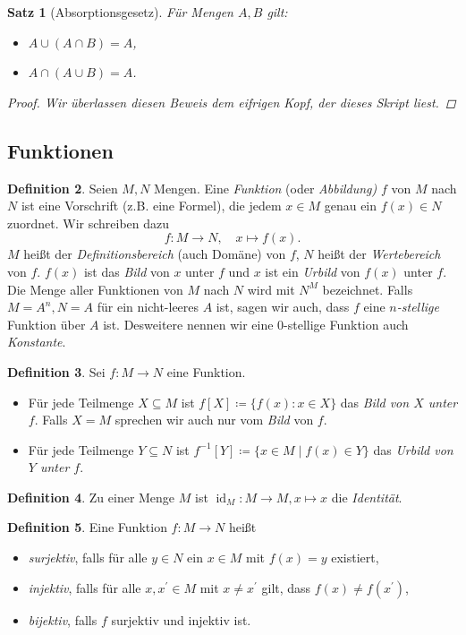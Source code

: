 \documentclass[11pt, a4paper]{article}
\theoremstyle{definition}
\newtheorem{definition}{Definition}[section]
\theoremstyle{plain}
\newtheorem{theorem}[definition]{Satz}
\numberwithin{equation}{section}
\DeclareMathOperator{\id}{id}
\begin{document}
\begin{theorem}[Absorptionsgesetz]
	Für Mengen $A, B$ gilt:
	\begin{itemize}
		\item $A \cup (A \cap B) = A$,
		\item $A \cap (A \cup B) = A$.
	\end{itemize}
	\begin{proof}
		Wir überlassen diesen Beweis dem eifrigen Kopf, der dieses Skript liest.
	\end{proof}
\end{theorem}


\subsection{Funktionen}\label{sec:pre_mappings}
\begin{definition}
	Seien $M, N$ Mengen. Eine \textit{Funktion} (oder \textit{Abbildung)} $f$ von $M$ nach $N$ ist eine Vorschrift (z.B. eine Formel), die jedem $x \in M$ genau ein $f(x) \in N$ zuordnet. Wir schreiben dazu
	$$
		f\colon M \to N, \quad x \mapsto f(x).
	$$
	$M$ heißt der \textit{Definitionsbereich} (auch Domäne) von $f$, $N$ heißt der \textit{Wertebereich} von $f$. $f(x)$ ist das \textit{Bild} von $x$ unter $f$ und $x$ ist ein \textit{Urbild} von $f(x)$ unter $f$. Die Menge aller Funktionen von $M$ nach $N$ wird mit $N^M$ bezeichnet. Falls $M = A^n, N = A$ für ein nicht-leeres $A$ ist, sagen wir auch, dass $f$ eine \textit{$n$-stellige} Funktion über $A$ ist. Desweitere nennen wir eine $0$-stellige Funktion auch \textit{Konstante}.
\end{definition}
\begin{definition}
	Sei $f\colon M \to N$ eine Funktion.
	\begin{itemize}
		\item Für jede Teilmenge $X \subseteq M$ ist $f[X] \coloneqq \{ f(x) : x \in X \}$ das \textit{Bild von $X$ unter $f$}. Falls $X = M$ sprechen wir auch nur vom \textit{Bild} von $f$.
		\item Für jede Teilmenge $Y \subseteq N$ ist $f^{-1}[Y] \coloneqq \{ x \in M \mid f(x) \in Y \}$ das \textit{Urbild von $Y$ unter $f$}.
	\end{itemize}
\end{definition}
\begin{definition}
	Zu einer Menge $M$ ist $\id_M\colon M \to M, x \mapsto x$ die \textit{Identität}.
\end{definition}
\begin{definition}
	Eine Funktion $f\colon M \to N$ heißt
	\begin{itemize}
		\item \textit{surjektiv}, falls für alle $y \in N$ ein $x \in M$ mit $f(x) = y$ existiert,
		\item \textit{injektiv}, falls für alle $x, x^\prime \in M$ mit $x \neq x^\prime$ gilt, dass $f(x) \neq f(x^\prime)$,
		\item \textit{bijektiv}, falls $f$ surjektiv und injektiv ist.
	\end{itemize}
\end{definition}
\end{document}
